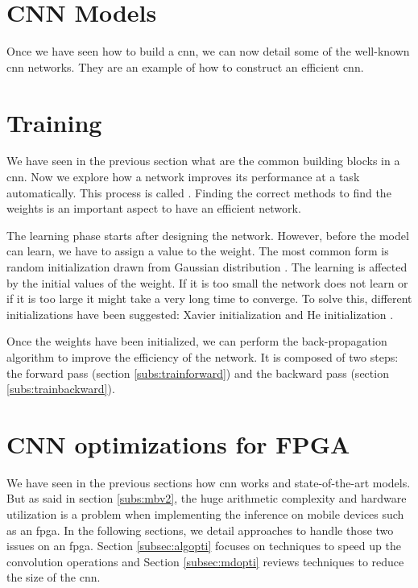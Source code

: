 \section{CNN Models} \label{sec:models}
Once we have seen how to build a \acrshort{cnn}, we can now detail some of the well-known \acrshort{cnn} networks. They are an example of how to construct an efficient \acrshort{cnn}.

%

%
%
\section{Training} \label{sec:train}
We have seen in the previous section what are the common building blocks in a \acrshort{cnn}. Now we explore how a network improves its performance at a task automatically. This process is called . Finding the correct methods to find the weights is an important aspect to have an efficient network.

The learning phase starts after designing the network. However, before the model can learn, we have to assign a value to the weight. The most common form is random initialization drawn from Gaussian distribution \cite{he_delving_2015}. The learning is affected by the initial values of the weight. If it is too small the network does not learn or if it is too large it might take a very long time to converge. To solve this, different initializations have been suggested: Xavier initialization \cite{glorot_understanding_2010} and He initialization \cite{he_delving_2015}.

Once the weights have been initialized, we can perform the back-propagation algorithm to improve the efficiency of the network. It is composed of two steps: the forward pass (section \ref{subs:trainforward}) and the backward pass (section \ref{subs:trainbackward}).
%

%

%
%
\section{CNN optimizations for FPGA}
%
%
We have seen in the previous sections how \acrshort{cnn} works and state-of-the-art models. But as said in section \ref{subs:mbv2}, the huge arithmetic complexity and hardware utilization is a problem when implementing the inference on mobile devices such as an \acrshort{fpga}. In the following sections, we detail approaches to handle those two issues on an \acrshort{fpga}. Section \ref{subsec:algopti} focuses on techniques to speed up the convolution operations and Section \ref{subsec:mdopti} reviews techniques to reduce the size of the \acrshort{cnn}.
%

%




